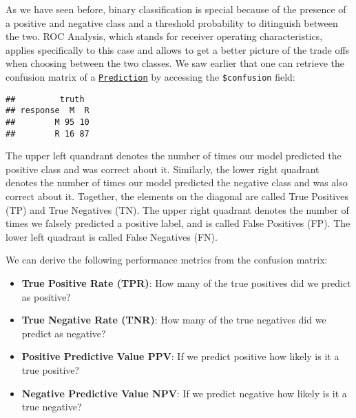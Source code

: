 \documentclass[
]{scrbook}
\newenvironment{Shaded}{\begin{snugshade}}{\end{snugshade}}
\newcommand{\AttributeTok}[1]{\textcolor[rgb]{0.77,0.63,0.00}{#1}}
\newcommand{\FunctionTok}[1]{\textcolor[rgb]{0.00,0.00,0.00}{#1}}
\newcommand{\NormalTok}[1]{#1}
\newcommand{\OtherTok}[1]{\textcolor[rgb]{0.56,0.35,0.01}{#1}}
\newcommand{\SpecialCharTok}[1]{\textcolor[rgb]{0.00,0.00,0.00}{#1}}
\newcommand{\StringTok}[1]{\textcolor[rgb]{0.31,0.60,0.02}{#1}}
\providecommand{\tightlist}{%
  \setlength{\itemsep}{0pt}\setlength{\parskip}{0pt}}
\renewenvironment{Shaded} {\begin{snugshade}\small} {\end{snugshade}}
\begin{document}
As we have seen before, binary classification is special because of the presence of a positive and negative class and a threshold probability to ditinguish between the two.
ROC Analysis, which stands for receiver operating characteristics, applies specifically to this case and allows to get a better picture of the trade offs when choosing between the two classes.
We saw earlier that one can retrieve the confusion matrix of a \href{https://mlr3.mlr-org.com/reference/Prediction.html}{\texttt{Prediction}} by accessing the \texttt{\$confusion} field:

\begin{Shaded}
\end{Shaded}

\begin{verbatim}
##         truth
## response  M  R
##        M 95 10
##        R 16 87
\end{verbatim}

The upper left quandrant denotes the number of times our model predicted the positive class and was correct about it.
Similarly, the lower right quadrant denotes the number of times our model predicted the negative class and was also correct about it.
Together, the elements on the diagonal are called True Positives (TP) and True Negatives (TN).
The upper right quadrant denotes the number of times we falsely predicted a positive label, and is called False Positives (FP).
The lower left quadrant is called False Negatives (FN).

We can derive the following performance metrics from the confusion matrix:

\begin{itemize}
\tightlist
\item
  \textbf{True Positive Rate (TPR)}: How many of the true positives did we predict as positive?
\item
  \textbf{True Negative Rate (TNR)}: How many of the true negatives did we predict as negative?
\item
  \textbf{Positive Predictive Value PPV}: If we predict positive how likely is it a true positive?
\item
  \textbf{Negative Predictive Value NPV}: If we predict negative how likely is it a true negative?
\end{itemize}
\end{document}
